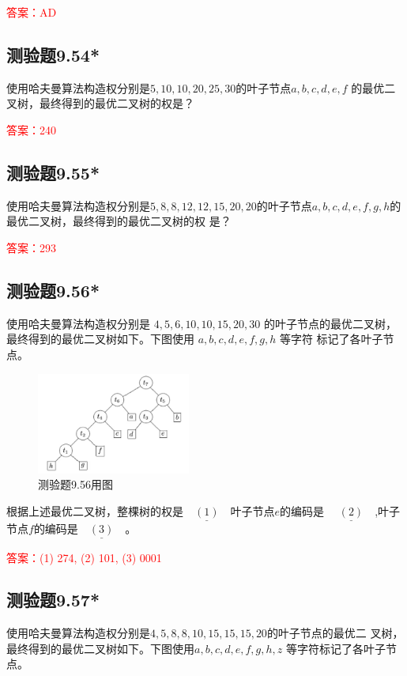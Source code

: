\documentclass[UTF8, heading=true]{ctexart}
\begin{document}
\textcolor{red}{答案：AD}

\subsection{测验题9.54*}

使用哈夫曼算法构造权分别是$5,10, 10,20,25,30$的叶子节点$a, b, c, d, e, f$
的最优二叉树，最终得到的最优二叉树的权是？

\textcolor{red}{答案：240}

\subsection{测验题9.55*}

使用哈夫曼算法构造权分别是$5, 8, 8, 12, 12, 15, 20, 20$的叶子节点$a,b,c,d,e,f,g,h$的最优二叉树，最终得到的最优二叉树的权
是？

\textcolor{red}{答案：293}

\subsection{测验题9.56*}

使用哈夫曼算法构造权分别是 $4,5,6,10,10,15,20,30$ 的叶子节点的最优二叉树，
最终得到的最优二叉树如下。下图使用 $a, b, c, d, e, f, g, h$ 等字符
标记了各叶子节点。

\begin{figure}[H]
  \centering
  \includegraphics[width=0.45\textwidth]{9.56.jpg} %
  \caption{测验题9.56用图}
\end{figure}

根据上述最优二叉树，整棵树的权是$\underline{\quad (1) \quad}$叶子节点$e$的编码是
$\underline{\quad (2)\quad}$,叶子节点$f$的编码是$\underline{\quad (3)\quad}$。

\textcolor{red}{答案：(1) 274, (2) 101, (3) 0001}

\subsection{测验题9.57*}

使用哈夫曼算法构造权分别是$4,5, 8, 8, 10, 15, 15, 15,20$的叶子节点的最优二
叉树，最终得到的最优二叉树如下。下图使用$a, b, c, d, e, f, g,h, z$
等字符标记了各叶子节点。
\end{document}
